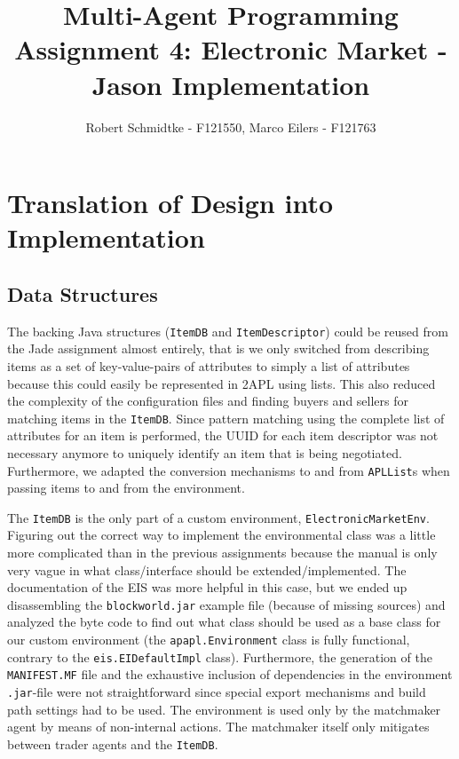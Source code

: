 \documentclass[a4paper,11pt]{article}
\begin{document}
\title{Multi-Agent Programming\\Assignment 4: Electronic Market - Jason Implementation}
\author{Robert Schmidtke - F121550, Marco Eilers - F121763}

\maketitle
\newpage

\section{Translation of Design into Implementation}

\subsection{Data Structures}

The backing Java structures (\texttt{ItemDB} and \texttt{ItemDescriptor}) could be reused from the Jade assignment almost entirely, that is we only switched from describing items as a set of key-value-pairs of attributes to simply a list of attributes because this could easily be represented in 2APL using lists. This also reduced the complexity of the configuration files and finding buyers and sellers for matching items in the \texttt{ItemDB}. Since pattern matching using the complete list of attributes for an item is performed, the UUID for each item descriptor was not necessary anymore to uniquely identify an item that is being negotiated. Furthermore, we adapted the conversion mechanisms to and from \texttt{APLList}s when passing items to and from the environment.

The \texttt{ItemDB} is the only part of a custom environment, \texttt{ElectronicMarketEnv}. Figuring out the correct way to implement the environmental class was a little more complicated than in the previous assignments because the manual is only very vague in what class/interface should be extended/implemented. The documentation of the EIS was more helpful in this case, but we ended up disassembling the \texttt{blockworld.jar} example file (because of missing sources) and analyzed the byte code to find out what class should be used as a base class for our custom environment (the \texttt{apapl.Environment} class is fully functional, contrary to the \texttt{eis.EIDefaultImpl} class). Furthermore, the generation of the \texttt{MANIFEST.MF} file and the exhaustive inclusion of dependencies in the environment \texttt{.jar}-file were not straightforward since special export mechanisms and build path settings had to be used. The environment is used only by the matchmaker agent by means of non-internal actions. The matchmaker itself only mitigates between trader agents and the \texttt{ItemDB}.
\end{document}
